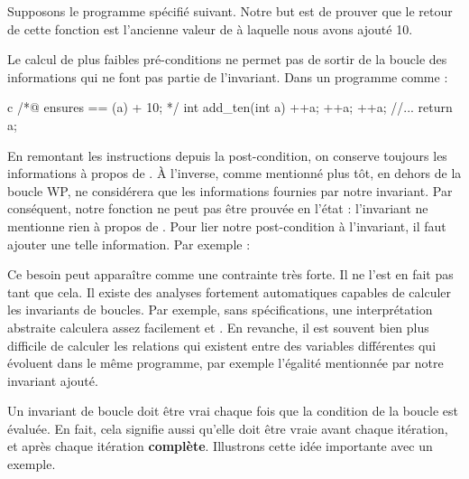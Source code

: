 

Supposons le programme spécifié suivant. Notre but est de prouver que le retour
de cette fonction est l'ancienne valeur de  à laquelle nous avons ajouté 10.






Le calcul de plus faibles pré-conditions ne permet pas de sortir de la boucle des
informations qui ne font pas partie de l'invariant. Dans un programme comme :



\begin{CodeBlock}{c}
/*@
    ensures \result == \old(a) + 10;
*/
int add_ten(int a){
    ++a;
    ++a;
    ++a;
    //...
    return a;
}
\end{CodeBlock}



En remontant les instructions depuis la post-condition, on conserve toujours les
informations à propos de . À l'inverse, comme mentionné plus tôt, en dehors
de la boucle WP, ne considérera que les informations fournies par notre
invariant. Par conséquent, notre fonction  ne peut pas être prouvée
en l'état : l'invariant ne mentionne rien à propos de . Pour lier notre
post-condition à l'invariant, il faut ajouter une telle information. Par 
exemple :






\begin{Information}
Ce besoin peut apparaître comme une contrainte très forte. Il ne l'est en fait pas
tant que cela. Il existe des analyses fortement automatiques capables de 
calculer les invariants de boucles. Par exemple, sans spécifications, une 
interprétation abstraite calculera assez facilement  et 
. En revanche, il est souvent bien plus difficile
de calculer les relations qui existent entre des variables différentes qui 
évoluent dans le même programme, par exemple l'égalité mentionnée par notre 
invariant ajouté.
\end{Information}




Un invariant de boucle doit être vrai chaque fois que la condition de la boucle est
évaluée. En fait, cela signifie aussi qu'elle doit être vraie avant chaque itération,
et après chaque itération \textbf{complète}. Illustrons cette idée importante avec un
exemple.


